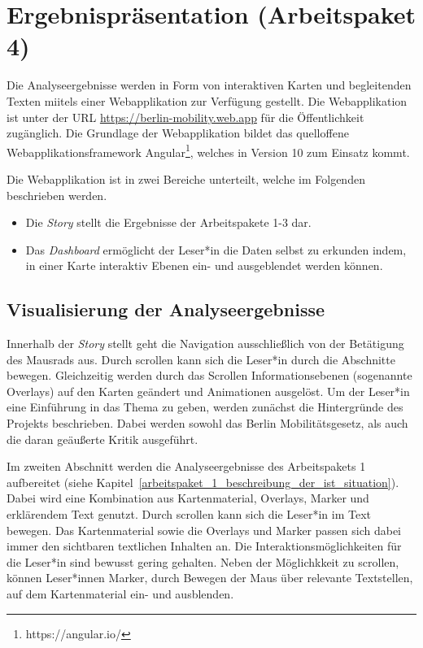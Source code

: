 \newpage

\section{Ergebnispräsentation (Arbeitspaket 4)}
\label{ergebnispraesentation}

Die Analyseergebnisse werden in Form von interaktiven Karten und begleitenden Texten miitels einer Webapplikation zur Verfügung gestellt. Die Webapplikation ist unter der URL \url{https://berlin-mobility.web.app} für die Öffentlichkeit zugänglich. Die Grundlage der Webapplikation bildet das quelloffene Webapplikationsframework Angular\footnote{https://angular.io/}, welches in Version 10 zum Einsatz kommt.


Die Webapplikation ist in zwei Bereiche unterteilt, welche im Folgenden beschrieben werden.

\begin{itemize}
    \item Die \emph{Story} stellt die Ergebnisse der Arbeitspakete 1-3 dar.
    \item Das \emph{Dashboard} ermöglicht der Leser*in die Daten selbst zu erkunden indem, in einer Karte interaktiv Ebenen ein- und ausgeblendet werden können.
\end{itemize}

\subsection{Visualisierung der Analyseergebnisse}
\label{visualisierung_der_analyseergebnisse}

Innerhalb der \emph{Story} stellt geht die Navigation ausschließlich von der Betätigung des Mausrads aus. Durch scrollen kann sich die Leser*in durch die Abschnitte bewegen. Gleichzeitig werden durch das Scrollen Informationsebenen (sogenannte Overlays) auf den Karten geändert und Animationen ausgelöst. Um der Leser*in eine Einführung in das Thema zu geben, werden zunächst die Hintergründe des Projekts beschrieben. Dabei werden sowohl das Berlin Mobilitätsgesetz, als auch die daran geäußerte Kritik ausgeführt.

Im zweiten Abschnitt werden die Analyseergebnisse des Arbeitspakets 1 aufbereitet (siehe Kapitel~\ref{arbeitspaket_1_beschreibung_der_ist_situation}). Dabei wird eine Kombination aus Kartenmaterial, Overlays, Marker und erklärendem Text genutzt. Durch scrollen kann sich die Leser*in im Text bewegen. Das Kartenmaterial sowie die Overlays und Marker passen sich dabei immer den sichtbaren textlichen Inhalten an. Die Interaktionsmöglichkeiten für die Leser*in sind bewusst gering gehalten. Neben der Möglichkkeit zu scrollen, können Leser*innen Marker, durch Bewegen der Maus über relevante Textstellen, auf dem Kartenmaterial ein- und ausblenden. 

